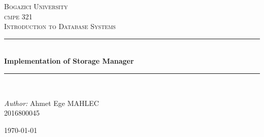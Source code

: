 \documentclass[12pt]{article}
\begin{document}
\begin{titlepage}

\newcommand{\HRule}{\rule{\linewidth}{0.5mm}} %

\center %
 

\textsc{\LARGE Bogazici University}\\[1.5cm] %
\textsc{\Large cmpe 321}\\[0.5cm] %
\textsc{\large Introduction to Database Systems}\\[0.5cm] %


\HRule \\[0.4cm]
{ \huge \bfseries Implementation of Storage Manager}\\[0.4cm] %
\HRule \\[1.5cm]
 


\begin{flushright} \large
\emph{Author:} Ahmet Ege MAHLEC \\
2016800045
\end{flushright}




\vspace*{\fill}
{\large \today}\\[3cm] %


\end{titlepage}
\end{document}
